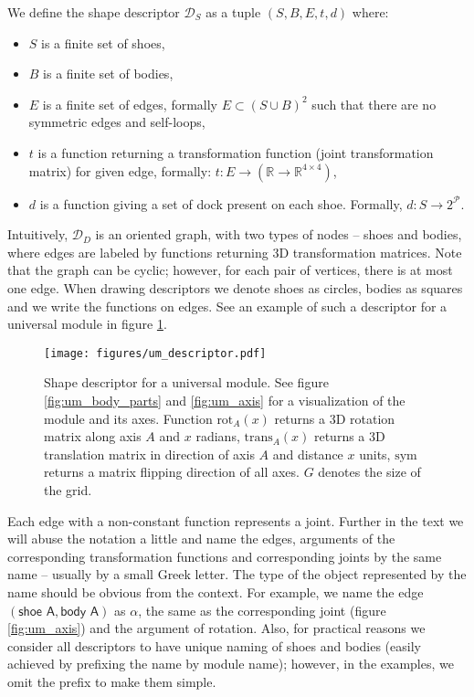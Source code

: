 We define the shape descriptor $\mathcal{D}_S$ as a tuple $(S, B, E, t, d)$
where:
\begin{itemize}
    \item $S$ is a finite set of shoes,
    \item $B$ is a finite set of bodies,
    \item $E$ is a finite set of edges, formally $E \subset (S\cup B)^2$ such
    that there are no symmetric edges and self-loops,
    \item $t$ is a function returning a transformation function (joint
    transformation matrix) for given edge, formally: $t:
    E\rightarrow(\mathds{R}\rightarrow\mathds{R}^{4\times4})$,
    \item $d$ is a function giving a set of dock present on each shoe. Formally,
    $d: S\rightarrow 2^\mathcal{P}$.
\end{itemize}
Intuitively, $\mathcal{D}_D$ is an oriented graph, with two types of nodes --
shoes and bodies, where edges are labeled by functions returning 3D
transformation matrices. Note that the graph can be cyclic; however, for each
pair of vertices, there is at most one edge. When drawing descriptors we denote
shoes as circles, bodies as squares and we write the functions on edges. See
an example of such a descriptor for a universal module in figure
\ref{fig:um_descriptor}.

\begin{figure}[t]
    \centering
    \texttt{[image: figures/um\_descriptor.pdf]}
    \caption{Shape descriptor for a universal module. See figure
    \ref{fig:um_body_parts} and \ref{fig:um_axis} for a visualization of the
    module and its axes. Function $\text{rot}_A(x)$ returns a 3D rotation matrix
    along axis $A$ and $x$ radians, $\text{trans}_A(x)$ returns a 3D translation
    matrix in direction of axis $A$ and distance $x$ units, $\text{sym}$ returns
    a matrix flipping direction of all axes. $G$ denotes the size of the grid.}
    \label{fig:um_descriptor}
\end{figure}

Each edge with a non-constant function represents a joint. Further in the text
we will abuse the notation a little and name the edges, arguments of the
corresponding transformation functions and corresponding joints by the same name
-- usually by a small Greek letter. The type of the object represented by the
name should be obvious from the context. For example, we name the edge
$(\textsf{shoe A}, \textsf{body A})$ as $\alpha$, the same as the corresponding
joint (figure \ref{fig:um_axis}) and the argument of rotation. Also, for
practical reasons we consider all descriptors to have unique naming of shoes and
bodies (easily achieved by prefixing the name by module name); however, in the
examples, we omit the prefix to make them simple.

